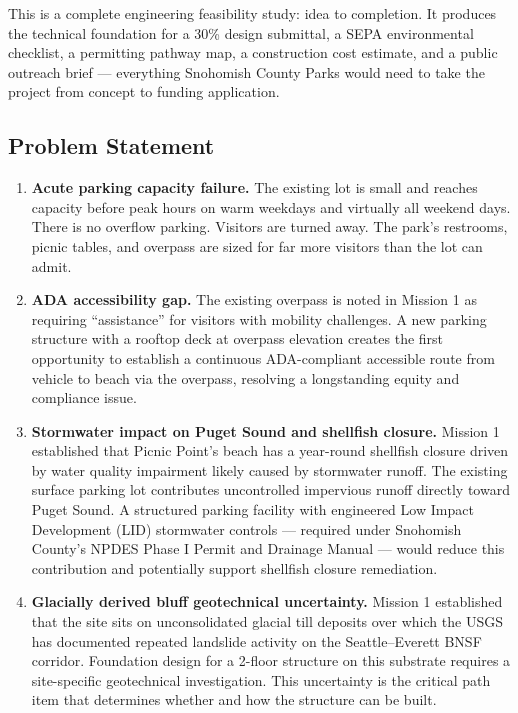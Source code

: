 \documentclass[11pt,letterpaper]{article}
\begin{document}
This is a complete engineering feasibility study: idea to completion. It produces the technical foundation for a 30\% design submittal, a SEPA environmental checklist, a permitting pathway map, a construction cost estimate, and a public outreach brief --- everything Snohomish County Parks would need to take the project from concept to funding application.

\subsection{Problem Statement}

\begin{enumerate}
  \item \textbf{Acute parking capacity failure.} The existing lot is small and reaches capacity before peak hours on warm weekdays and virtually all weekend days. There is no overflow parking. Visitors are turned away. The park's restrooms, picnic tables, and overpass are sized for far more visitors than the lot can admit.

  \item \textbf{ADA accessibility gap.} The existing overpass is noted in Mission 1 as requiring ``assistance'' for visitors with mobility challenges. A new parking structure with a rooftop deck at overpass elevation creates the first opportunity to establish a continuous ADA-compliant accessible route from vehicle to beach via the overpass, resolving a longstanding equity and compliance issue.

  \item \textbf{Stormwater impact on Puget Sound and shellfish closure.} Mission 1 established that Picnic Point's beach has a year-round shellfish closure driven by water quality impairment likely caused by stormwater runoff. The existing surface parking lot contributes uncontrolled impervious runoff directly toward Puget Sound. A structured parking facility with engineered Low Impact Development (LID) stormwater controls --- required under Snohomish County's NPDES Phase I Permit and Drainage Manual --- would reduce this contribution and potentially support shellfish closure remediation.

  \item \textbf{Glacially derived bluff geotechnical uncertainty.} Mission 1 established that the site sits on unconsolidated glacial till deposits over which the USGS has documented repeated landslide activity on the Seattle--Everett BNSF corridor. Foundation design for a 2-floor structure on this substrate requires a site-specific geotechnical investigation. This uncertainty is the critical path item that determines whether and how the structure can be built.


\end{enumerate}
\end{document}
